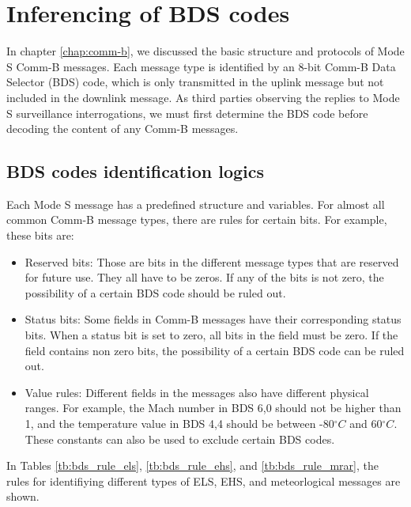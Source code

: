 \chapter{Inferencing of BDS codes}

In chapter \ref{chap:comm-b}, we discussed the basic structure and protocols of Mode S Comm-B messages. Each message type is identified by an 8-bit Comm-B Data Selector (BDS) code, which is only transmitted in the uplink message but not included in the downlink message. As third parties observing the replies to Mode S surveillance interrogations, we must first determine the BDS code before decoding the content of any Comm-B messages. 


\section{BDS codes identification logics}

Each Mode S message has a predefined structure and variables. For almost all common Comm-B message types, there are rules for certain bits. For example, these bits are:
\begin{itemize}
    \item Reserved bits: Those are bits in the different message types that are reserved for future use. They all have to be zeros. If any of the bits is not zero, the possibility of a certain BDS code should be ruled out.
    \item Status bits: Some fields in Comm-B messages have their corresponding status bits. When a status bit is set to zero, all bits in the field must be zero. If the field contains non zero bits, the possibility of a certain BDS code can be ruled out.
    \item Value rules: Different fields in the messages also have different physical ranges. For example, the Mach number in BDS 6,0 should not be higher than 1, and the temperature value in BDS 4,4 should be between -80$^\circ C$ and 60$^\circ C$. These constants can also be used to exclude certain BDS codes.
\end{itemize}


In Tables \ref{tb:bds_rule_els}, \ref{tb:bds_rule_ehs}, and \ref{tb:bds_rule_mrar}, the rules for identifiying different types of ELS, EHS, and meteorlogical messages are shown.


